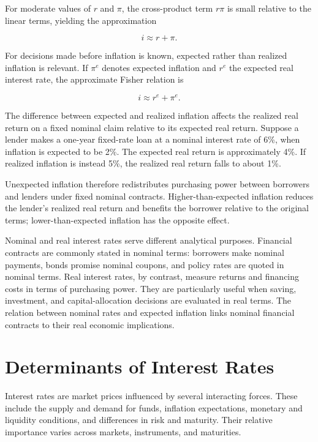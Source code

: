 For moderate values of $r$ and $\pi$, the cross-product term $r\pi$ is small relative to the linear terms, yielding the approximation

\begin{equation}
i\approx r+\pi.
\label{eq:ch6-fisher-approx}
\end{equation}

For decisions made before inflation is known, expected rather than realized inflation is relevant. If $\pi^e$ denotes expected inflation and $r^e$ the expected real interest rate, the approximate Fisher relation is

\begin{equation}
i\approx r^e+\pi^e.
\label{eq:ch6-fisher-expected}
\end{equation}

The difference between expected and realized inflation affects the realized real return on a fixed nominal claim relative to its expected real return. Suppose a lender makes a one-year fixed-rate loan at a nominal interest rate of 6\%, when inflation is expected to be 2\%. The expected real return is approximately 4\%. If realized inflation is instead 5\%, the realized real return falls to about 1\%.

Unexpected inflation therefore redistributes purchasing power between borrowers and lenders under fixed nominal contracts. Higher-than-expected inflation reduces the lender's realized real return and benefits the borrower relative to the original terms; lower-than-expected inflation has the opposite effect.

Nominal and real interest rates serve different analytical purposes. Financial contracts are commonly stated in nominal terms: borrowers make nominal payments, bonds promise nominal coupons, and policy rates are quoted in nominal terms. Real interest rates, by contrast, measure returns and financing costs in terms of purchasing power. They are particularly useful when saving, investment, and capital-allocation decisions are evaluated in real terms. The relation between nominal rates and expected inflation links nominal financial contracts to their real economic implications.

\section{Determinants of Interest Rates}

Interest rates are market prices influenced by several interacting forces. These include the supply and demand for funds, inflation expectations, monetary and liquidity conditions, and differences in risk and maturity. Their relative importance varies across markets, instruments, and maturities.

